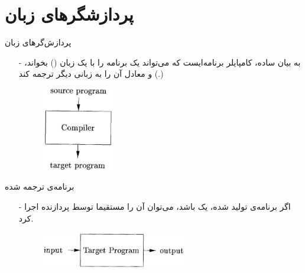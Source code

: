 \section{پردازشگر‌های زبان}
\begin{frame}[fragile]{پردازش‌گر‌های زبان}
\begin{itemize}\itemr
\item[-]
به بیان ساده، کامپایلر برنامه‌ایست که می‌تواند یک برنامه را با یک زبان () بخواند، و معادل آن را به زبانی دیگر ترجمه کند  (.)
\vspace{5mm}
\begin{figure}[H]
\begin{center}
\includegraphics[width=0.3\textwidth, height=0.6\textheight, angle=1]{docs/images/sct}
\end{center}
\end{figure}
\end{itemize}
\end{frame}

\begin{frame}{برنامه‌ی ترجمه شده}
\begin{itemize}\itemr
\item[-]
اگر برنامه‌ی تولید شده، یک 
باشد، می‌توان آن را مستقیما توسط پردازنده اجرا کرد.
\vspace{5mm}
\begin{figure}[H]
\begin{center}
\includegraphics[width=0.6\textwidth, height=0.3\textheight, angle=0.5]{docs/images/executable}
\end{center}
\end{figure}
\end{itemize}
\end{frame}


